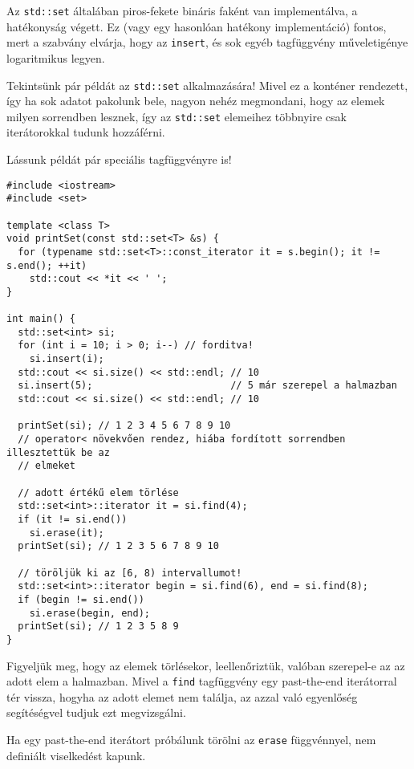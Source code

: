 \documentclass[../cpp_book/cpp_book.tex]{subfiles}
\begin{document}
	\begin{note}
		Az \texttt{std::set} általában piros-fekete bináris faként van implementálva, a hatékonyság végett. Ez (vagy egy hasonlóan hatékony implementáció) fontos, mert a szabvány elvárja, hogy az \texttt{insert}, és sok egyéb tagfüggvény műveletigénye logaritmikus legyen.
	\end{note}
	Tekintsünk pár példát az \texttt{std::set} alkalmazására! Mivel ez a konténer rendezett, így ha sok adatot pakolunk bele, nagyon nehéz megmondani, hogy az elemek milyen sorrendben lesznek, így az \texttt{std::set} elemeihez többnyire csak iterátorokkal tudunk hozzáférni.
	
	Lássunk példát pár speciális tagfüggvényre is!
\begin{lstlisting}
#include <iostream>
#include <set>

template <class T>
void printSet(const std::set<T> &s) {
  for (typename std::set<T>::const_iterator it = s.begin(); it != s.end(); ++it)
    std::cout << *it << ' ';
}

int main() {
  std::set<int> si;
  for (int i = 10; i > 0; i--) // forditva!
    si.insert(i);
  std::cout << si.size() << std::endl; // 10
  si.insert(5);                        // 5 már szerepel a halmazban
  std::cout << si.size() << std::endl; // 10

  printSet(si); // 1 2 3 4 5 6 7 8 9 10
  // operator< növekvően rendez, hiába fordított sorrendben illesztettük be az
  // elmeket

  // adott értékű elem törlése
  std::set<int>::iterator it = si.find(4);
  if (it != si.end())
    si.erase(it);
  printSet(si); // 1 2 3 5 6 7 8 9 10

  // töröljük ki az [6, 8) intervallumot!
  std::set<int>::iterator begin = si.find(6), end = si.find(8);
  if (begin != si.end())
    si.erase(begin, end);
  printSet(si); // 1 2 3 5 8 9
}
\end{lstlisting}
	Figyeljük meg, hogy az elemek törlésekor, leellenőriztük, valóban szerepel-e az az adott elem a halmazban. Mivel a \texttt{find} tagfüggvény egy past-the-end iterátorral tér vissza, hogyha az adott elemet nem találja, az azzal való egyenlőség segítéségvel tudjuk ezt megvizsgálni.
	
	Ha egy past-the-end iterátort próbálunk törölni az \texttt{erase} függvénnyel, nem definiált viselkedést kapunk.
	
\end{document}
